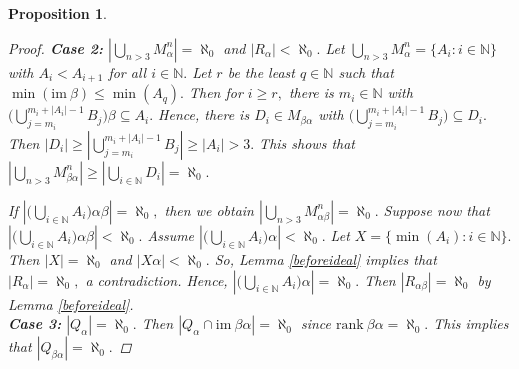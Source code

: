 \documentclass[11pt]{article}
\theoremstyle{plain}
\newtheorem{proposition}[theorem]{Proposition}
\theoremstyle{definition}
\newcommand{\rank}{\mathrm{rank~}}
\newcommand{\im}{\mathrm{im~}}
\begin{document}
\begin{proposition}
\begin{proof}
\noindent\textbf{Case 2:} $\left\vert \bigcup_{n>3}M_{\alpha}^{n}\right\vert=\aleph_{0}$ and $\left\vert R_{\alpha}\right\vert<\aleph_{0}.$ Let $\bigcup_{n>3}M_{\alpha}^{n}=\{A_{i}:i\in\mathbb{N}\}$ with $A_{i}<A_{i+1}$ for all $i\in\mathbb{N}.$ Let $r$ be the least $q\in\mathbb{N}$ such that $\min(\im\beta)\leq\min(A_{q}).$ Then for $i\geq r,$ there is $m_{i}\in\mathbb{N}$ with $\big(\bigcup_{j=m_{i}}^{m_{i}+\left\vert A_{i}\right\vert-1}B_{j}\big)\beta\subseteq A_{i}.$ Hence, there is $D_{i}\in M_{\beta\alpha}$ with $\big(\bigcup_{j=m_{i}}^{m_{i}+\left\vert A_{i}\right\vert-1}B_{j}\big)\subseteq D_{i}.$ Then $\left\vert D_{i}\right\vert\geq \left\vert\bigcup_{j=m_{i}}^{m_{i}+\left\vert A_{i}\right\vert-1}B_{j}\right\vert\geq\left\vert A_{i}\right\vert>3.$ This shows that $\left\vert \bigcup_{n>3}M_{\beta\alpha}^{n}\right\vert\geq\left\vert\bigcup_{i\in\mathbb{N}}D_{i}\right\vert=\aleph_{0}.$ 

If $\left\vert\big(\bigcup_{i\in\mathbb{N}}A_{i}\big)\alpha\beta\right\vert=\aleph_{0},$ then we obtain $\left\vert \bigcup_{n>3}M_{\alpha\beta}^{n} \right\vert=\aleph_{0}.$ Suppose now that $\left\vert\big(\bigcup_{i\in\mathbb{N}}A_{i}\big)\alpha\beta\right\vert<\aleph_{0}.$ Assume $\left\vert\big(\bigcup_{i\in\mathbb{N}}A_{i}\big)\alpha\right\vert<\aleph_{0}.$ Let $X=\{\min (A_{i}):i\in\mathbb{N}\}.$ Then $\left\vert X\right\vert=\aleph_{0}$ and $\left\vert X\alpha\right\vert<\aleph_{0}.$ So, Lemma \ref{beforeideal} implies that $\left\vert R_{\alpha}\right\vert=\aleph_{0},$ a contradiction. Hence, $\left\vert\big(\bigcup_{i\in\mathbb{N}}A_{i}\big)\alpha\right\vert=\aleph_{0}.$ Then $\left\vert R_{\alpha\beta}\right\vert=\aleph_{0}$ by Lemma \ref{beforeideal}.\\


\noindent\textbf{Case 3:} $\left\vert Q_{\alpha}\right\vert=\aleph_{0}.$ Then $\left\vert Q_{\alpha}\cap\im\beta\alpha\right\vert=\aleph_{0}$ since $\rank\beta\alpha=\aleph_{0}.$ This implies that $\left\vert Q_{\beta\alpha}\right\vert=\aleph_{0}.$


\end{proof}
\end{proposition}
\end{document}
